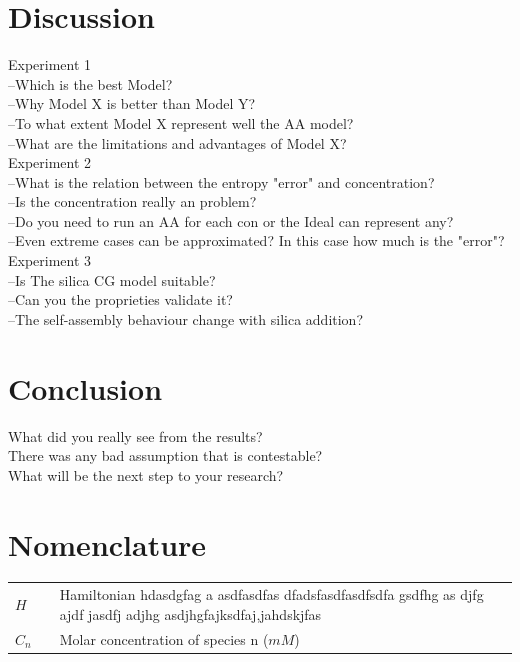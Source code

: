 \documentclass[10pt,a4paper,twoside]{article}
\begin{document}
\section{Discussion}


Experiment 1\\
 --Which is the best Model?\\
 --Why Model X is better than Model Y?\\
 --To what extent Model X represent well the AA model?\\
 --What are the limitations and advantages of Model X?\\
Experiment 2\\
 --What is the relation between the entropy "error" and concentration? \\
 --Is the concentration really an problem?\\
 --Do you need to run an AA for each con or the Ideal can represent any?\\
 --Even extreme cases can be approximated? In this case how much is the "error"?\\
Experiment 3\\
 --Is The silica CG model suitable? \\
 --Can you the proprieties validate it?\\
 --The self-assembly behaviour change with silica addition?\\

\section{Conclusion}

 What did you really see from the results?\\
 There was any bad assumption that is contestable?\\
 What will be the next step to your research? \\
 
\section{Nomenclature} 
   \begin{tabulary}{1.0\textwidth}{LCL}
   $H$ &   & Hamiltonian hdasdgfag \cite{magic}a asdfasdfas dfadsfasdfasdfsdfa gsdfhg as djfg ajdf jasdfj adjhg asdjhgfajksdfaj,jahdskjfas\\
   $C_n$ &   & Molar concentration of species n ($mM$) \\
   \end{tabulary}
\end{document}
